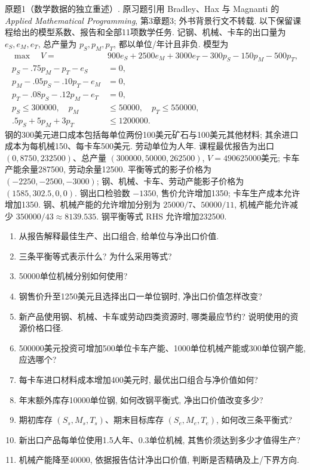 \begin{exercise}\label{ass:15053-rec4-q1}
原题1（数学数据的独立重述）. 原习题引用 Bradley、Hax 与 Magnanti 的 \emph{Applied Mathematical Programming}, 第3章题3; 外书背景行文不转载. 以下保留课程给出的模型系数、报告和全部11项数学任务. 记钢、机械、卡车的出口量为 $e_S,e_M,e_T$, 总产量为 $p_S,p_M,p_T$, 都以单位/年计且非负. 模型为
\begin{align*}
\max\quad V={}&900e_S+2500e_M+3000e_T-300p_S-150p_M-500p_T,\\
p_S-.75p_M-p_T-e_S&=0,\\
p_M-.05p_S-.10p_T-e_M&=0,\\
p_T-.08p_S-.12p_M-e_T&=0,\\
p_S\le300000,\quad p_M&\le50000,\quad p_T\le550000,\\
.5p_S+5p_M+3p_T&\le1200000.
\end{align*}
钢的300美元进口成本包括每单位两份100美元矿石与100美元其他材料; 其余进口成本为每机械150、每卡车500美元. 劳动单位为人年. 课程最优报告为出口 $(0,8750,232500)$、总产量 $(300000,50000,262500)$, $V=490625000$美元; 卡车产能余量287500, 劳动余量12500. 平衡等式的影子价格为 $(-2250,-2500,-3000)$; 钢、机械、卡车、劳动产能影子价格为 $(1585,302.5,0,0)$. 钢出口检验数 $-1350$, 售价允许增加1350; 卡车生产成本允许增加1350. 钢、机械产能的允许增加分别为 $25000/7$、$50000/11$, 机械产能允许减少 $350000/43\approx8139.535$. 钢平衡等式 RHS 允许增加232500.
\begin{enumerate}[label=(\alph*)]
\item 从报告解释最佳生产、出口组合, 给单位与净出口价值.
\item 三条平衡等式表示什么? 为什么采用等式?
\item 50000单位机械分别如何使用?
\item 钢售价升至1250美元且选择出口一单位钢时, 净出口价值怎样改变?
\item 新产品使用钢、机械、卡车或劳动四类资源时, 哪类最应节约? 说明使用的资源价格口径.
\item 500000美元投资可增加500单位卡车产能、1000单位机械产能或300单位钢产能, 应选哪个?
\item 每卡车进口材料成本增加400美元时, 最优出口组合与净价值如何?
\item 年末额外库存10000单位钢, 如何改钢平衡式, 净出口价值改变多少?
\item 期初库存 $(S_s,M_s,T_s)$、期末目标库存 $(S_e,M_e,T_e)$, 如何改三条平衡式?
\item 新出口产品每单位使用1.5人年、0.3单位机械, 其售价须达到多少才值得生产?
\item 机械产能降至40000, 依据报告估计净出口价值, 判断是否精确及上/下界方向.
\end{enumerate}
\end{exercise}
